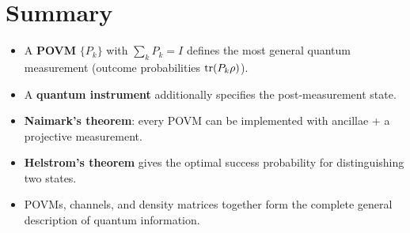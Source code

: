 \documentclass[11pt]{article}
\theoremstyle{definition}
\begin{document}
\section{Summary}

\begin{itemize}
    \item A \textbf{POVM} $\{P_k\}$ with $\sum_k P_k=I$ defines the most general quantum measurement (outcome probabilities $\tr(P_k\rho)$).
    \item A \textbf{quantum instrument} additionally specifies the post-measurement state.
    \item \textbf{Naimark's theorem}: every POVM can be implemented with ancillae + a projective measurement.
    \item \textbf{Helstrom's theorem} gives the optimal success probability for distinguishing two states.
    \item POVMs, channels, and density matrices together form the complete general description of quantum information.
\end{itemize}
\end{document}
